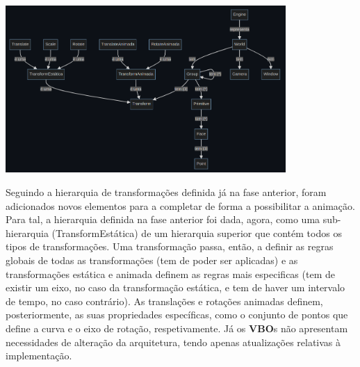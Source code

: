 \begin{center}
    \includegraphics[width=0.8\textwidth]{imgs/concept2.png}
    \label{fig:domeng}
\end{center}

\noindent
Seguindo a hierarquia de transformações definida já na fase
anterior, foram adicionados novos elementos para a completar
de forma a possibilitar a animação.
\newline
\break
\noindent
Para tal, a hierarquia definida na fase anterior foi dada, agora,
como uma sub-hierarquia (TransformEstática) de um hierarquia
superior que contém todos os tipos de transformações.
\newline
\break
\noindent
Uma transformação passa, então, a definir as regras globais
de todas as transformações (tem de poder ser aplicadas) e as
transformações estática e animada definem as regras mais
especificas (tem de existir um eixo, no caso da transformação
estática, e tem de haver um intervalo de tempo, no caso
contrário).
\newline
\break
\noindent
As translações e rotações animadas definem, posteriormente,
as suas propriedades específicas, como o conjunto de pontos
que define a curva e o eixo de rotação, respetivamente.
\newline
\break
\noindent
Já os \textbf{VBO}s não apresentam necessidades de alteração
da arquitetura, tendo apenas atualizações relativas à
implementação.